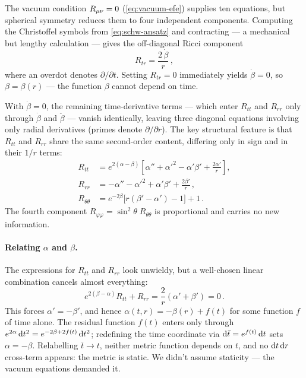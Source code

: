 The vacuum condition $R_{\mu\nu} = 0$ (\cref{eq:vacuum-efe}) supplies ten
equations, but spherical symmetry reduces them to four independent
components.  Computing the Christoffel symbols from
\cref{eq:schw-ansatz} and contracting --- a mechanical but lengthy
calculation --- gives the off-diagonal Ricci component
%
\begin{equation}
  R_{tr} = \frac{2\,\dot{\beta}}{r} \,,
  \label{eq:schw-ricci-tr}
\end{equation}
%
where an overdot denotes $\partial/\partial t$.  Setting
$R_{tr} = 0$ immediately yields $\dot{\beta} = 0$, so
$\beta = \beta(r)$ --- the function $\beta$ cannot depend on time.

With $\dot{\beta} = 0$, the remaining time-derivative terms ---
which enter $R_{tt}$ and $R_{rr}$ only through $\dot{\beta}$ and
$\ddot{\beta}$ --- vanish identically, leaving three diagonal
equations involving only radial derivatives (primes denote
$\partial/\partial r$).  The key structural feature is that $R_{tt}$
and $R_{rr}$ share the same second-order content, differing only
in sign and in their $1/r$ terms:
%
\begin{align}
  R_{tt} &= e^{2(\alpha-\beta)}\!\left[
    \alpha'' + {\alpha'}^{2} - \alpha'\beta'
    + \frac{2\alpha'}{r}\right] ,
  \label{eq:schw-ricci-tt} \\[4pt]
  R_{rr} &= -\alpha'' - {\alpha'}^{2} + \alpha'\beta'
    + \frac{2\beta'}{r} \,,
  \label{eq:schw-ricci-rr} \\[4pt]
  R_{\theta\theta} &= e^{-2\beta}\bigl[
    r\!\left(\beta' - \alpha'\right) - 1\bigr] + 1 \,.
  \label{eq:schw-ricci-thth}
\end{align}
%
The fourth component $R_{\varphi\varphi} =
\sin^2\!\theta\;R_{\theta\theta}$ is proportional and carries no
new information.

\paragraph{Relating $\alpha$ and $\beta$.}

The expressions for $R_{tt}$ and $R_{rr}$ look unwieldy, but a
well-chosen linear combination cancels almost everything:
%
\begin{equation}
  e^{2(\beta-\alpha)} R_{tt} + R_{rr}
  = \frac{2}{r}\!\left(\alpha' + \beta'\right) = 0 \,.
  \label{eq:schw-alpha-beta-sum}
\end{equation}
%
This forces $\alpha' = -\beta'$, and hence $\alpha(t,r) = -\beta(r) +
f(t)$ for some function $f$ of time alone.  The residual function
$f(t)$ enters only through $e^{2\alpha}\,\mathrm{d} t^2 = e^{-2\beta +
2f(t)}\,\mathrm{d} t^2$; redefining the time coordinate via $\mathrm{d}\bar{t} =
e^{f(t)}\,\mathrm{d} t$ sets $\alpha = -\beta$.  Relabelling $\bar{t} \to t$,
neither metric function depends on $t$, and no $\mathrm{d} t\,\mathrm{d} r$
cross-term appears: the metric is static.  We didn't assume
staticity --- the vacuum equations demanded it.

